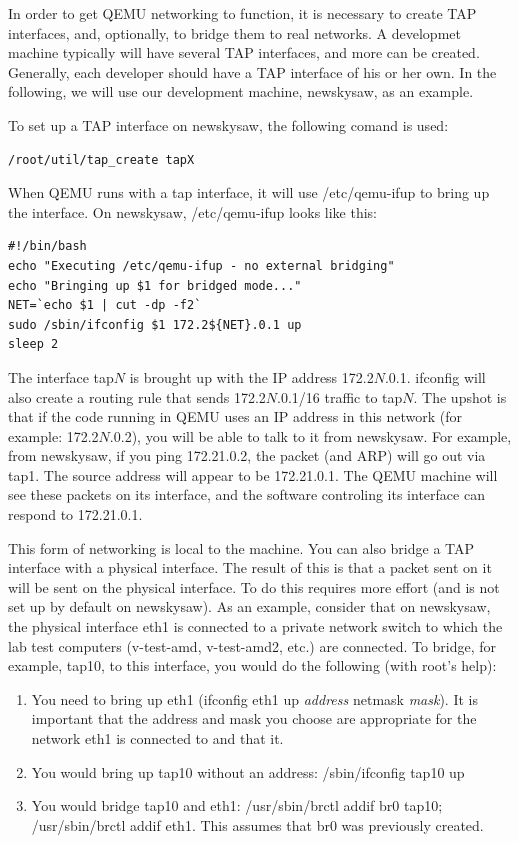 \documentclass[11pt]{article}
\begin{document}
In order to get QEMU networking to function, it is necessary to create
TAP interfaces, and, optionally, to bridge them to real networks.  A
developmet machine typically will have several TAP interfaces, and
more can be created.  Generally, each developer should have a TAP
interface of his or her own.  In the following, we will use our
development machine, newskysaw, as an example.

To set up a TAP interface on newskysaw, the following comand is used:
\begin{verbatim}
/root/util/tap_create tapX
\end{verbatim}

When QEMU runs with a tap interface, it will use /etc/qemu-ifup to
bring up the interface.  On newskysaw, /etc/qemu-ifup looks like this:

\begin{verbatim}
#!/bin/bash
echo "Executing /etc/qemu-ifup - no external bridging"
echo "Bringing up $1 for bridged mode..."
NET=`echo $1 | cut -dp -f2` 
sudo /sbin/ifconfig $1 172.2${NET}.0.1 up
sleep 2
\end{verbatim}

The interface tap$N$ is brought up with the IP address 172.2$N$.0.1.
ifconfig will also create a routing rule that sends 172.2$N$.0.1/16
traffic to tap$N$.  The upshot is that if the code running in QEMU
uses an IP address in this network (for example: 172.2$N$.0.2), you
will be able to talk to it from newskysaw.  For example, from
newskysaw, if you ping 172.21.0.2, the packet (and ARP) will go out via
tap1.  The source address will appear to be 172.21.0.1.  The QEMU
machine will see these packets on its interface, and the software
controling its interface can respond to 172.21.0.1.  

This form of networking is local to the machine.  You can also bridge
a TAP interface with a physical interface.  The result of this is that
a packet sent on it will be sent on the physical interface.  To do
this requires more effort (and is not set up by default on newskysaw).
As an example, consider that on newskysaw, the physical interface eth1
is connected to a private network switch to which the lab test
computers (v-test-amd, v-test-amd2, etc.) are connected.  To bridge,
for example, tap10, to this interface, you would do the following
(with root's help):
\begin{enumerate}
\item You need to bring up eth1 (ifconfig eth1 up {\em address} netmask {\em mask}).  It is important that the address and mask you choose are appropriate for the network eth1 is connected to and that it.
\item You would bring up tap10 without an address:  /sbin/ifconfig
tap10 up
\item You would bridge tap10 and eth1:  /usr/sbin/brctl addif br0
tap10; /usr/sbin/brctl addif eth1.  This assumes that br0 was
previously created. 
\end{enumerate}
\end{document}
